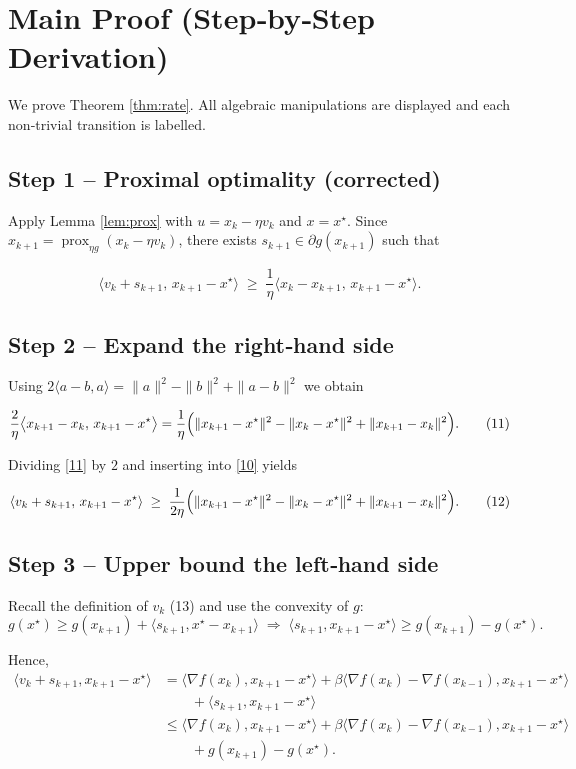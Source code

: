 \documentclass{article}
\newcommand{\prox}{\operatorname{prox}}
\begin{document}
\section*{Main Proof (Step‑by‑Step Derivation)}
We prove Theorem \ref{thm:rate}. All algebraic manipulations are displayed and each non‑trivial transition is labelled.

\subsection*{Step 1 – Proximal optimality (corrected)}
Apply Lemma \ref{lem:prox} with $u = x_k-\eta v_k$ and $x = x^\star$.  
Since $x_{k+1}= \prox_{\eta g}(x_k-\eta v_k)$, there exists $s_{k+1}\in\partial g(x_{k+1})$ such that  

\[
\Big\langle v_k + s_{k+1},\,x_{k+1}-x^\star\Big\rangle
\;\ge\;\frac{1}{\eta}\Big\langle x_k-x_{k+1},\,x_{k+1}-x^\star\Big\rangle .
\tag{10}
\]


\subsection*{Step 2 – Expand the right‑hand side}
Using $2\langle a-b,a\rangle = \|a\|^{2}-\|b\|^{2}+\|a-b\|^{2}$ we obtain  

\[
\frac{2}{\eta}\big\langle x_{k+1}-x_k ,\,x_{k+1}-x^\star\big\rangle
= \frac{1}{\eta}\Bigl(\|x_{k+1}-x^\star\|^{2}-\|x_k-x^\star\|^{2}
+\|x_{k+1}-x_k\|^{2}\Bigr).
\tag{11}
\]

Dividing \eqref{11} by $2$ and inserting into \eqref{10} yields  

\[
\langle v_k+s_{k+1},\,x_{k+1}-x^\star\rangle
\;\ge\;
\frac{1}{2\eta}\Bigl(\|x_{k+1}-x^\star\|^{2}
-\|x_k-x^\star\|^{2}
+\|x_{k+1}-x_k\|^{2}\Bigr).
\tag{12}
\]

\subsection*{Step 3 – Upper bound the left‑hand side}
Recall the definition of $v_k$ (13) and use the convexity of $g$:
\[
g(x^\star)\ge g(x_{k+1})+\langle s_{k+1},x^\star-x_{k+1}\rangle
\;\Longrightarrow\;
\langle s_{k+1},x_{k+1}-x^\star\rangle\ge g(x_{k+1})-g(x^\star).
\tag{13}
\]

Hence,
\[
\begin{aligned}
\langle v_k+s_{k+1},x_{k+1}-x^\star\rangle
&= \langle \nabla f(x_k),x_{k+1}-x^\star\rangle
   +\beta\langle \nabla f(x_k)-\nabla f(x_{k-1}),x_{k+1}-x^\star\rangle \\
&\qquad +\langle s_{k+1},x_{k+1}-x^\star\rangle \\
&\le \langle \nabla f(x_k),x_{k+1}-x^\star\rangle
   +\beta\langle \nabla f(x_k)-\nabla f(x_{k-1}),x_{k+1}-x^\star\rangle \\
&\qquad + g(x_{k+1})-g(x^\star).
\end{aligned}
\tag{14}
\]
\end{document}
